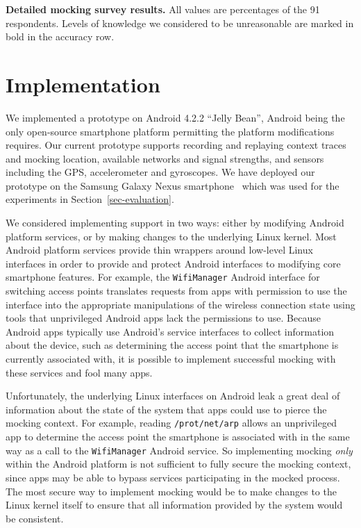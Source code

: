 \begin{table*}[t]



\caption{\textbf{Detailed mocking survey results.} All values are percentages
of the 91 respondents. Levels of knowledge we considered to be unreasonable
are marked in bold in the accuracy row.}

\label{table-surveyresults}

\end{table*}

\section{Implementation}
\label{sec-implementation}

We implemented a \PocketMocker{} prototype on Android 4.2.2 ``Jelly Bean'',
Android being the only open-source smartphone platform permitting the
platform modifications \PocketMocker{} requires. Our current prototype
supports recording and replaying context traces and mocking location,
available networks and signal strengths, and sensors including the GPS,
accelerometer and gyroscopes. We have deployed our prototype on the Samsung
Galaxy Nexus smartphone~\cite{galaxynexus} which was used for the experiments
in Section~\ref{sec-evaluation}.


We considered implementing \PocketMocker{} support in two ways: either by
modifying Android platform services, or by making changes to the underlying
Linux kernel. Most Android platform services provide thin wrappers around
low-level Linux interfaces in order to provide and protect Android interfaces
to modifying core smartphone features. For example, the \texttt{WifiManager}
Android interface for switching access points translates requests from apps
with permission to use the interface into the appropriate manipulations of
the wireless connection state using tools that unprivileged Android apps lack
the permissions to use. Because Android apps typically use Android's service
interfaces to collect information about the device, such as determining the
access point that the smartphone is currently associated with, it is possible
to implement successful mocking with these services and fool many apps.

Unfortunately, the underlying Linux interfaces on Android leak a great deal
of information about the state of the system that apps could use to pierce
the mocking context. For example, reading \texttt{/prot/net/arp} allows an
unprivileged app to determine the access point the smartphone is associated
with in the same way as a call to the \texttt{WifiManager} Android service.
So implementing mocking \textit{only} within the Android platform is not
sufficient to fully secure the mocking context, since apps may be able to
bypass services participating in the mocked process. The most secure way to
implement mocking would be to make changes to the Linux kernel itself to
ensure that all information provided by the system would be consistent.

